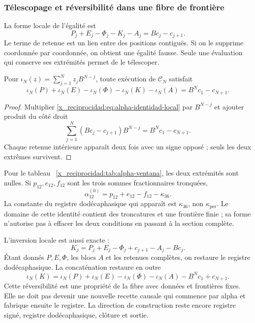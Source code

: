 \subsubsection{Télescopage et réversibilité dans une fibre de frontière}
\label{x_reciprocidad:subsec:alpha-telescopia}

La forme locale de l'égalité est
\begin{equation}
 P_j+E_j-\Phi_j-K_j-A_j=Bc_j-c_{j+1}.
 \label{x_reciprocidad:eq:alpha-identidad-local}
\end{equation}
Le terme de retenue est un lien entre des positions contiguës. Si on le supprime coordonnée par coordonnée, on obtient une égalité fausse. Seule une évaluation qui conserve ses extrémités permet de le télescoper.

\begin{proposition}
\label{x_reciprocidad:prop:alpha-telescopia}
Pour \(\iota_N(z)=\sum_{j=1}^{N}z_jB^{N-j}\), toute exécution de
\(\mathcal C_N\) satisfait
\begin{equation}
 \iota_N(P)+\iota_N(E)-\iota_N(\Phi)-\iota_N(K)-\iota_N(A)
 =B^Nc_1-c_{N+1}.
 \label{x_reciprocidad:eq:alpha-telescopia}
\end{equation}
\end{proposition}

\begin{proof}
Multiplier \eqref{x_reciprocidad:eq:alpha-identidad-local} par \(B^{N-j}\) et ajouter  
produit du côté droit
\[
 \sum_{j=1}^{N}(Bc_j-c_{j+1})B^{N-j}=B^Nc_1-c_{N+1}.
\]
Chaque retenue intérieure apparaît deux fois avec un signe opposé ; seuls les deux extrêmes survivent.
\end{proof}

Pour le tableau ~\ref{x_reciprocidad:tab:alpha-ventana}, les deux extrémités sont nulles. Si
\(p_{12},e_{12},f_{12}\) sont les trois sommes fractionnaires tronquées,
\[
 \alpha_{12}^{(0)}=p_{12}+e_{12}-f_{12}-\kappa_{36}.
\]
La constante du registre dodécaphasique qui apparaît est \(\kappa_{36}\), non
\(\kappa_{\mathrm{per}}\). Le domaine de cette identité contient
des troncatures et une frontière finie ; sa forme n'autorise pas à effacer les deux
conditions en passant à la section complète.

L'inversion locale est aussi exacte :
\[
 K_j=P_j+E_j-\Phi_j+c_{j+1}-A_j-Bc_j.
\]
Étant donnés \(P,E,\Phi\), les blocs \(A\) et les retenues complètes,  
on restaure le registre dodécaphasique. La concaténation restaure en outre
\[
 \iota_N(K)=\iota_N(P)+\iota_N(E)-\iota_N(\Phi)-\iota_N(A)
             -B^Nc_1+c_{N+1}.
\]
Cette réversibilité est une propriété de la fibre avec données et frontières fixes. Elle ne doit pas devenir une nouvelle recette causale qui commence par alpha et fabrique ensuite le registre. La direction de construction reste encore registre signé, registre dodécaphasique, clôture et sortie.

